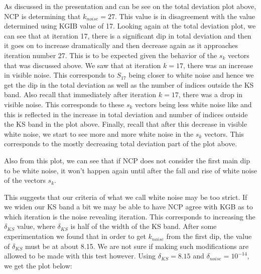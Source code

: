 \documentclass[11pt]{amsart}
\begin{document}
As discussed in the presentation and can be see on the total deviation plot above, NCP
is determining that $k_{noise} = 27$. This value is in disagreement with the value determined
using KGIB value of 17. Looking again at the total deviation plot, we can see that at iteration 17,
there is a significant dip in total deviation and then it goes on to increase dramatically and then 
decrease again as it approaches iteration number 27. This is to be expected given the
behavior of the $s_k$ vectors that was discussed above. We saw that at iteration $k={17}$, 
there was an increase in visible noise. This corresponds to $S_{17}$ being closer to white noise
and hence we get the dip in the total deviation as well as the number of indices outside the 
KS band.  
Also recall that immediately after iteration
$k=17$, there was a drop in visible noise. This corresponds to these $s_k$ vectors being less
white noise like and this is reflected in the increase in total deviation and number of indices outside 
the KS band in the plot above. 
Finally, recall that after this decrease in visible white noise, we start to see more and more white 
noise in the $s_k$ vectors. This corresponds to the mostly decreasing total deviation
part of the plot above. 

Also from this plot, we can see that if NCP does not consider the first main dip to be white noise,
it won't happen again until after the fall and rise of white noise of the vectors $s_k$.

This suggests that our criteria of what we call white noise may be too strict. If we widen our KS band
a bit we may be able to have NCP agree with KGB as to which iteration is the noise revealing iteration.
This corresponds to increasing the $\delta_{KS}$ value, where $\delta_{KS}$ is half of the width
of the KS band. After some experimentation we found that in order to get 
$k_{noise}$ from the first dip, the value of $\delta_{KS}$ must be at about 8.15.
We are not sure if making such modifications are allowed to be made with this test however.
Using $\delta_{KS}=8.15$ and $\delta_{noise}=10^{-14}$, we get the plot below:
\end{document}
